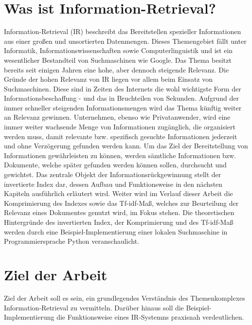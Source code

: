 \section{Was ist Information-Retrieval?}
Information-Retrieval (IR) beschreibt das Bereitstellen spezieller Informationen aus einer großen und unsortierten Datenmengen.
Dieses Themengebiet fällt unter Informatik, Informationswissenschaften sowie Computerlinguistik und ist ein wesentlicher Bestandteil von Suchmaschinen wie Google.
\newline
Das Thema besitzt bereits seit einigen Jahren eine hohe, aber dennoch steigende Relevanz. Die Gründe der hohen Relevanz von IR liegen vor allem beim Einsatz von Suchmaschinen. Diese sind in Zeiten des Internets die wohl wichtigste Form
der Informationsbeschaffung - und das in Bruchteilen von Sekunden. Aufgrund der immer schneller steigenden Informationsmengen wird das Thema künftig weiter an Relevanz gewinnen. Unternehmen, ebenso wie Privatanwender, wird eine immer weiter
wachsende Menge von Informationen zugänglich, die organisiert werden muss, damit relevante bzw. spezifisch gesuchte Informationen jederzeit und ohne Verzögerung gefunden werden kann.
\newline
Um das Ziel der Bereitstellung von Informationen gewährleisten zu können, werden sämtliche Informationen bzw. Dokumente, welche später gefunden werden können sollen, durchsucht und gewichtet.
Das zentrale Objekt der Informationsrückgewinnung stellt der invertierte Index dar, dessen Aufbau und Funktionsweise in den nächsten Kapiteln ausführlich erläutert wird.
Weiter wird im Verlauf dieser Arbeit die Komprimierung des Indexes sowie das Tf-idf-Maß, welches zur Beurteilung der Relevanz eines Dokumentes genutzt wird, im Fokus stehen.
\newline
Die theoretischen Hintergründe des invertierten Index, der Komprimierung und des Tf-idf-Maß werden durch eine Beispiel-Implementierung einer lokalen Suchmaschine in Programmiersprache Python veranschaulicht.

\section{Ziel der Arbeit}
Ziel der Arbeit soll es sein, ein grundlegendes Verständnis des Themenkomplexes Information-Retrieval zu vermitteln.
Darüber hinaus soll die Beispiel-Implementierung die Funktionsweise eines IR-Systemns praxisnah verdeutlichen.